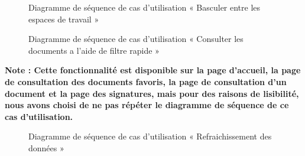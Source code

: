 \begin{figure}[H]
  \centering
  \caption{Diagramme de séquence de cas d'utilisation « Basculer entre les espaces de travail »}
  \label{fig:sequence_switch_workspace}
\end{figure}

\begin{figure}[H]
  \centering
  \caption{Diagramme de séquence de cas d'utilisation « Consulter les documents a l'aide de filtre rapide »}
  \label{fig:sequence_docs_quick_filter}
\end{figure}

\textbf{Note : Cette fonctionnalité est disponible sur la page d'accueil, la page de consultation des documents favoris, la page de consultation d'un document et la page des signatures, mais pour des raisons de lisibilité, nous avons choisi de ne pas répéter le diagramme de séquence de ce cas d'utilisation.}
\begin{figure}[H]
  \centering
  \caption{Diagramme de séquence de cas d'utilisation « Refraichissement des données »}
  \label{fig:sequence_refresh_data}
\end{figure}



